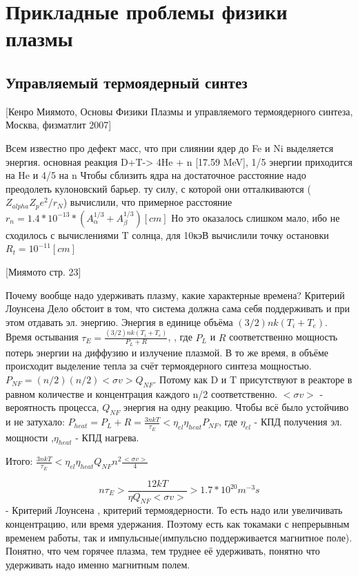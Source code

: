 \documentclass[10pt, a4paper]{article}
\begin{document}
\section{Прикладные проблемы физики плазмы}
\label{sec.14}


\subsection{Управляемый термоядерный синтез}
\label{14}

[Кенро Миямото, Основы Физики Плазмы и управляемого термоядерного синтеза, Москва, физматлит 2007]

Всем известно про дефект масс, что при слиянии ядер до Fe и Ni выделяется энергия.
основная реакция D+T-> 4He + n [17.59 MeV], 1/5 энергии приходится на He и 4/5 на n
Чтобы сблизить ядра на достаточное расстояние надо преодолеть кулоновский барьер. ту силу, с которой они отталкиваются ($Z_{alpha}Z_p e^2/r_N$) вычислили, что примерное расстояние $r_{n}=1.4*10^{-13}*(A^{1/3}_{\alpha}+A^{1/3}_{\beta}) [cm]$ Но это оказалось слишком мало, ибо не сходилось с вычислениями T солнца, для 10кэВ вычислили точку остановки $R_t=10^{-11} [cm]$

[Миямото стр. 23]

Почему вообще надо удерживать плазму, какие характерные времена? Критерий Лоунсена 
Дело обстоит в том, что система должна сама себя поддерживать и при этом отдавать эл. энергию. Энергия в единице объёма $(3/2)nk(T_i+T_e)$. Время остывания $\tau_E = \frac { (3/2)nk(T_i+T_e) }{P_L+R}$, , где $P_L$ и $R$ соответственно мощность потерь энергии на диффузию и излучение плазмой. В то же время, в объёме происходит выделение тепла за счёт термоядерного синтеза мощностью. $P_{NF}=(n/2)(n/2)<\sigma v> Q_{NF} $. Потому
 как D и T присутствуют в реакторе в равном количестве и концентрация каждого n/2 соответственно. $<\sigma v> $ - вероятность процесса,   $Q_{NF} $ энергия на одну реакцию.
Чтобы всё было устойчиво и не затухало: $P_{heat}=P_L + R = \frac{3nkT}{\tau_E} < \eta_{el} \eta_{heat} P_{NF} $, где $\eta_{el} $ - КПД получения эл. мощности ,$ \eta_{heat} $ - КПД нагрева.

Итого: $ \frac{3nkT}{\tau_E} < \eta_{el} \eta_{heat} Q_{NF} n^{2} \frac{<\sigma v>}{4}$

\begin{equation}
	\label{eq.Disp14.1.1}
	n \tau_E > \frac{12 kT}{\eta Q_{NF} <\sigma v>} > 1.7*10^{20} m^{-3} s
\end{equation}
 - Критерий Лоунсена , критерий термоядерности. То есть надо или увеличивать концентрацию, или время удержания. Поэтому есть как токамаки с непрерывным временем работы, так и импульсные(импульсно поддерживается магнитное поле).
Понятно, что чем горячее плазма, тем труднее её удерживать, понятно что удерживать надо именно магнитным полем.
\end{document}
